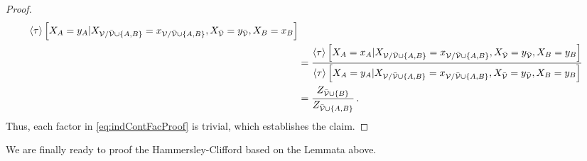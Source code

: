 \begin{proof}
\begin{align*}
{        }{
            \left\langle \tau\right\rangle \left[ 
                X_{A} =y_{A}
             | X_{\mathcal{V}/\bar{\mathcal{V}}\cup\{A,B\}}=x_{\mathcal{V}/\bar{\mathcal{V}}\cup\{A,B\}} , X_{\bar{\mathcal{V}}}=y_{\bar{\mathcal{V}}}, X_{B}=x_{B} \right]
        } \\
        & =
        \frac{
            \left\langle \tau\right\rangle \left[ 
                X_{A}=x_{A}
             | X_{\mathcal{V}/\bar{\mathcal{V}}\cup\{A,B\}}=x_{\mathcal{V}/\bar{\mathcal{V}}\cup\{A,B\}}, X_{\bar{\mathcal{V}}}=y_{\bar{\mathcal{V}}}, X_{B} = y_{B} \right]
        }{
            \left\langle \tau\right\rangle \left[ 
                X_{A} =y_{A}
             | X_{\mathcal{V}/\bar{\mathcal{V}}\cup\{A,B\}}=x_{\mathcal{V}/\bar{\mathcal{V}}\cup\{A,B\}}, X_{\bar{\mathcal{V}}}=y_{\bar{\mathcal{V}}},X_{B} = y_{B} \right]
        } \\
        & =
        \frac{
            Z_{\bar{\mathcal{V}}\cup\{B\}}
        }{
            Z_{\bar{\mathcal{V}}\cup\{A,B\}}
        } \, .
    \end{align*}
    Thus, each factor in \eqref{eq:indContFacProof} is trivial, which establishes the claim.
\end{proof}

We are finally ready to proof the Hammersley-Clifford  based on the Lemmata above.

